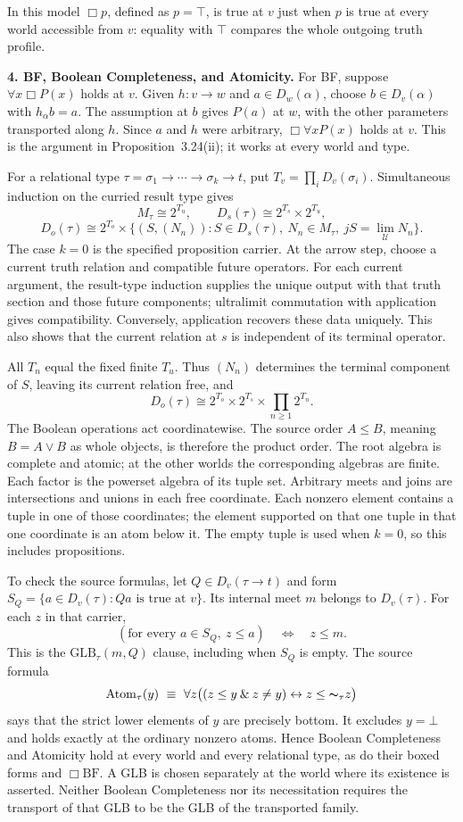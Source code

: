 \documentclass[12pt,leqno]{article}
\newcommand{\AND}{\ensuremath{\mathbin{\&}}}
\newcommand{\OR}{\ensuremath{\vee}}
\newcommand{\IFF}{\ensuremath{\leftrightarrow}}
\newcommand{\NOT}{\ensuremath{\text{$\thicksim$}}}
\newcommand{\U}{\mathcal U}
\begin{document}
In this model $\Box p$, defined as $p=\top$, is true at $v$ just when
$p$ is true at every world accessible from $v$: equality with $\top$
compares the whole outgoing truth profile.

\medskip
\noindent\textbf{4. BF, Boolean Completeness, and Atomicity.}
For BF, suppose $\forall x\Box P(x)$ holds at $v$.
Given $h:v\to w$ and $a\in D_w(\alpha)$, choose $b\in D_v(\alpha)$
with $h_\alpha b=a$. The assumption at $b$ gives $P(a)$ at $w$,
with the other parameters transported along $h$. Since $a$ and $h$
were arbitrary, $\Box\forall xP(x)$ holds at $v$. This is the
argument in Proposition~3.24(ii); it works at every world and type.

For a relational type $\tau=\sigma_1\to\cdots\to\sigma_k\to t$, put
$T_v=\prod_iD_v(\sigma_i)$. Simultaneous induction on the curried result
type gives
\[
 M_\tau\cong 2^{T_u},\qquad D_s(\tau)\cong 2^{T_s}\times2^{T_u},
\]
\[
 D_o(\tau)\cong 2^{T_o}\times
 \{(S,(N_n)):S\in D_s(\tau),\ N_n\in M_\tau,\ jS=\lim_\U N_n\}.
\]
The case $k=0$ is the specified proposition carrier. At the arrow step,
choose a current truth relation and compatible future operators. For each
current argument, the result-type induction supplies the unique output
with that truth section and those future components; ultralimit
commutation with application gives compatibility. Conversely, application
recovers these data uniquely. This also shows that the current relation
at $s$ is independent of its terminal operator.

All $T_n$ equal the fixed finite $T_u$. Thus $(N_n)$ determines the
terminal component of $S$, leaving its current relation free, and
\[
 D_o(\tau)\cong 2^{T_o}\times2^{T_s}\times\prod_{n\geq1}2^{T_n}.
\]
The Boolean operations act coordinatewise. The source order
$A\leq B$, meaning $B=A\OR B$ as whole objects, is therefore the product
order. The root algebra is complete and atomic; at the other worlds the
corresponding algebras are finite. Each factor is the powerset algebra of its tuple
set. Arbitrary meets and joins are intersections and unions in each
free coordinate. Each nonzero element contains a tuple in one of
those coordinates; the element supported on that one tuple in that
one coordinate is an atom below it. The empty tuple is used when
$k=0$, so this includes propositions.

To check the source formulas, let $Q\in D_v(\tau\to t)$ and form
$S_Q=\{a\in D_v(\tau):Qa\text{ is true at }v\}$.
Its internal meet $m$ belongs to $D_v(\tau)$. For each $z$ in that
carrier,
\[
  (\text{for every }a\in S_Q,\ z\leq a)
        \quad\Longleftrightarrow\quad z\leq m.
\]
This is the $\mathrm{GLB}_\tau(m,Q)$ clause, including
when $S_Q$ is empty. The source formula
\[
 \mathrm{Atom}_\tau(y)\ \equiv\
 \forall z\bigl((z\leq y\AND z\neq y)\IFF z\leq\NOT_\tau z\bigr)
\]
says that the strict lower elements of $y$ are precisely bottom.
It excludes $y=\bot$ and holds exactly at the ordinary nonzero
atoms. Hence Boolean Completeness and Atomicity hold at every
world and every relational type, as do their boxed forms and
$\Box\mathrm{BF}$. A GLB is chosen separately at the world where
its existence is asserted. Neither Boolean Completeness nor its
necessitation requires the transport of that GLB to be the GLB
of the transported family.
\end{document}
